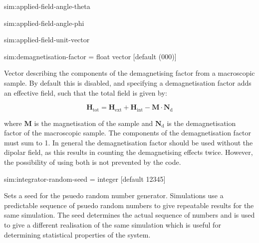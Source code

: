 {\zicf sim:applied-field-angle-theta}

{\zicf sim:applied-field-angle-phi}

{\zicf sim:applied-field-unit-vector}

{\zicf sim:demagnetisation-factor = float vector [default (000)]} Vector describing the components of the demagnetising factor from a macroscopic sample. By default this is disabled, and specifying a demagnetisation factor adds an effective field, such that the total field is given by:

\begin{equation*}
\mathbf{H}_{\mathrm{tot}} = \mathbf{H}_{\mathrm{ext}} + \mathbf{H}_{\mathrm{int}} - \mathbf{M} \cdot \mathbf{N}_{\mathrm{d}}
\end{equation*}

\noindent where $\mathbf{M}$ is the magnetisation of the sample and $\mathbf{N}_{\mathrm{d}}
$ is the demagnetisation factor of the macroscopic sample. The components of the demagnetisation factor must sum to 1. In general the demagnetisation factor should be used without the dipolar field, as this results in counting the demagnetising effects twice. However, the possibility of using both is not prevented by the code.



{\zicf sim:integrator-random-seed = integer [default 12345]} Sets a seed for the psuedo random number generator. Simulations use a predictable sequence of psuedo random numbers to give repeatable results for the same simulation. The seed determines the actual sequence of numbers and is used to give a different realisation of the same simulation which is useful for determining statistical properties of the system.

